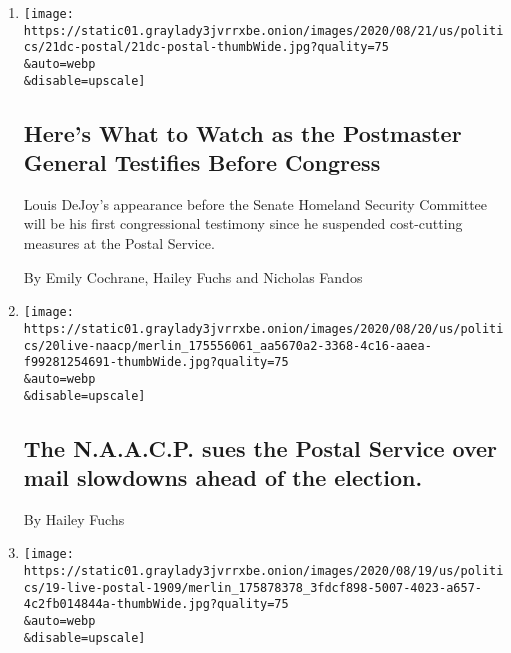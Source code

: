\begin{enumerate}
\def\labelenumi{\arabic{enumi}.}
\item
  \href{/2020/08/20/us/politics/louis-dejoy-testimony-postal-service.html}{}

  \texttt{[image: https://static01.graylady3jvrrxbe.onion/images/2020/08/21/us/politics/21dc-postal/21dc-postal-thumbWide.jpg?quality=75\\\&auto=webp\\\&disable=upscale]}

  \hypertarget{heres-what-to-watch-as-the-postmaster-general-testifies-before-congress}{%
  \subsection{Here's What to Watch as the Postmaster General Testifies
  Before
  Congress}\label{heres-what-to-watch-as-the-postmaster-general-testifies-before-congress}}

  Louis DeJoy's appearance before the Senate Homeland Security Committee
  will be his first congressional testimony since he suspended
  cost-cutting measures at the Postal Service.

  By Emily Cochrane, Hailey Fuchs and Nicholas Fandos
\item
  \href{/2020/08/20/us/elections/the-naacp-sues-the-postal-service-over-mail-slowdowns-ahead-of-the-election.html}{}

  \texttt{[image: https://static01.graylady3jvrrxbe.onion/images/2020/08/20/us/politics/20live-naacp/merlin\_175556061\_aa5670a2-3368-4c16-aaea-f99281254691-thumbWide.jpg?quality=75\\\&auto=webp\\\&disable=upscale]}

  \hypertarget{the-naacp-sues-the-postal-service-over-mail-slowdowns-ahead-of-the-election}{%
  \subsection{The N.A.A.C.P. sues the Postal Service over mail slowdowns
  ahead of the
  election.}\label{the-naacp-sues-the-postal-service-over-mail-slowdowns-ahead-of-the-election}}

  By Hailey Fuchs
\item
  \href{/2020/08/20/us/elections/election-concerns-persist-despite-louis-dejoys-move-to-halt-postal-changes.html}{}

  \texttt{[image: https://static01.graylady3jvrrxbe.onion/images/2020/08/19/us/politics/19-live-postal-1909/merlin\_175878378\_3fdcf898-5007-4023-a657-4c2fb014844a-thumbWide.jpg?quality=75\\\&auto=webp\\\&disable=upscale]}


\end{enumerate}
